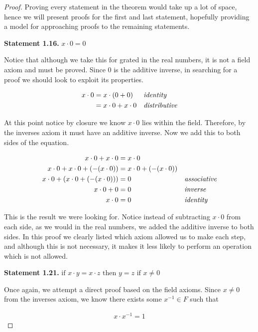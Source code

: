 \documentclass{report}
\newcommand{\header}[2]{\begin{flushright} \textbf{#1} #2 \end{flushright}}
\begin{document}
\begin{proof}
	Proving every statement in the theorem would take up a lot of space, hence we will present proofs for the first and last statement, hopefully providing a model for approaching proofs to the remaining statements.
	
	\header{Statement 1.16. }{$x \cdot 0 = 0$}
	
	Notice that although we take this for grated in the real numbers, it is not a field axiom and must be proved. Since 0 is the additive inverse, in searching for a proof we should look to exploit its properties.

	\begin{align*}
		x \cdot 0 &= x \cdot (0 + 0) &&\emph{identity} \\
		&= x \cdot 0 + x \cdot 0 &&\emph{distributive}
	\end{align*}
	
	At this point notice by closure we know $x \cdot 0$ lies within the field. Therefore, by the inverses axiom it must have an additive inverse. Now we add this to both sides of the equation.
	
	\begin{align*}
		x \cdot 0 + x \cdot 0 &= x \cdot 0 && \\
		x \cdot 0 + x \cdot 0 + (-(x \cdot 0)) &= x \cdot 0 + (-(x \cdot 0)) && \\
		x \cdot 0 + (x \cdot 0 + (-(x \cdot 0))) &= 0  &&\emph{associative} \\
		x \cdot 0 + 0 &= 0 &&\emph{inverse} \\
		x \cdot 0 &= 0 &&\emph{identity}
	\end{align*}
	
	This is the result we were looking for. Notice instead of subtracting $x \cdot 0$ from each side, as we would in the real numbers, we added the additive inverse to  both sides. In this proof we clearly listed which axiom allowed us to make each step, and although this is not necessary, it makes it less likely to perform an operation which is not allowed.
	
	\header{Statement 1.21. }{$\text{if } x \cdot y = x \cdot z \text{ then } y = z \text { if } x \neq 0$}
	
	Once again, we attempt a direct proof based on the field axioms. Since $x \neq 0$ from the inverses axiom, we know there exists some $x^{-1} \in F$ such that
	
	\begin{align*}
		x \cdot x^{-1} = 1
	\end{align*}
	

\end{proof}
\end{document}
